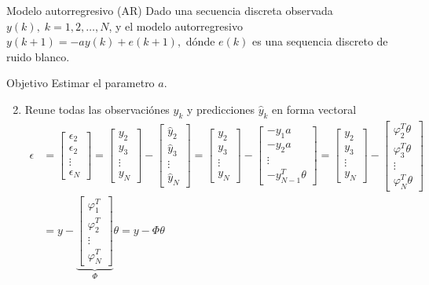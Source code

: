 \documentclass[presentation,aspectratio=169]{beamer}
\begin{document}
\begin{frame}[label={sec:org2841d86}]{Modelo autorregresivo (AR)}
Dado una secuencia discreta observada \(y(k), \; k=1,2,\ldots,N\), y el modelo autorregresivo
\(y(k+1) = -ay(k) + e(k+1),\)
dónde \(e(k)\) es una sequencia discreto de ruido blanco.

\alert{Objetivo} Estimar el parametro \(a\).

\begin{enumerate}
\setcounter{enumi}{1}
\item Reune todas las observaciónes \(y_k\) y predicciones \(\hat{y}_k\) en forma vectoral
\begin{align*}
\epsilon &= \begin{bmatrix} \epsilon_2\\\epsilon_2\\\vdots\\\epsilon_N\end{bmatrix} =  \begin{bmatrix} y_2\\ y_3\\\vdots\\y_N \end{bmatrix} - \begin{bmatrix} \hat{y}_2\\ \hat{y}_3\\\vdots\\\hat{y}_N \end{bmatrix}
 =  \begin{bmatrix} y_2\\ y_3\\\vdots\\y_N \end{bmatrix} - \begin{bmatrix} -y_1 a\\ -y_2 a\\\vdots\\-y_{N-1}^T\theta \end{bmatrix} =  \begin{bmatrix} y_2\\ y_3\\\vdots\\y_N \end{bmatrix} - \begin{bmatrix} \varphi_2^T\theta\\ \varphi_3^T\theta\\\vdots\\\varphi_N^T\theta \end{bmatrix}\\
&= y - \underbrace{\begin{bmatrix}\varphi_1^T\\\varphi_2^T\\\vdots\\\varphi_N^T\end{bmatrix}}_{\Phi}\theta = y - \Phi\theta 
\end{align*}
\end{enumerate}
\end{frame}
\end{document}
